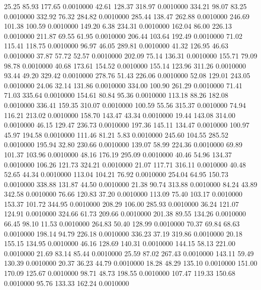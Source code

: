   25.25   85.93  177.65   0.0010000
  42.61  128.37  318.97   0.0010000
 334.21   98.07   83.25   0.0010000
 332.92   76.32  284.82   0.0010000
 285.44  138.47  262.88   0.0010000
 246.69  101.38  100.59   0.0010000
 149.20    6.38  234.31   0.0010000
 162.04   86.00  226.13   0.0010000
 211.87   69.55   61.95   0.0010000
 206.44  103.64  192.49   0.0010000
  71.02  115.41  118.75   0.0010000
  96.97   46.05  289.81   0.0010000
  41.32  126.95   46.63   0.0010000
  37.87   57.72   52.57   0.0010000
 202.09   75.14  136.31   0.0010000
 155.71   79.09   98.78   0.0010000
  40.68  173.61  154.52   0.0010000
 155.14  123.96  311.26   0.0010000
  93.44   49.20  329.42   0.0010000
 278.76   51.43  226.06   0.0010000
  52.08  129.01  243.05   0.0010000
  24.06   32.14  131.86   0.0010000
 334.00  100.90  261.29   0.0010000
  71.41   71.03  335.64   0.0010000
 154.61   80.84   95.36   0.0010000
 113.18   88.26  182.08   0.0010000
 336.41  159.35  310.07   0.0010000
 100.59   55.56  315.37   0.0010000
  74.94  116.21  213.02   0.0010000
 158.70  143.47   43.34   0.0010000
  19.44  143.08  314.00   0.0010000
  46.15  129.47  236.73   0.0010000
 197.36  145.11  134.47   0.0010000
 100.97   45.97  194.58   0.0010000
 111.46   81.21    5.83   0.0010000
 245.60  104.55  285.52   0.0010000
 195.94   32.80  230.66   0.0010000
 139.07   58.99  224.36   0.0010000
  69.89  101.37  103.96   0.0010000
  48.16  176.19  295.09   0.0010000
  40.46   54.96  134.37   0.0010000
 106.26  121.73  324.21   0.0010000
  21.07  117.71  316.11   0.0010000
  40.48   52.65   44.34   0.0010000
 113.04  104.21   76.92   0.0010000
 254.04   64.95  150.73   0.0010000
 338.88  131.87   44.50   0.0010000
  21.38   90.74  313.88   0.0010000
  84.24   43.89  342.58   0.0010000
  76.66  120.83   37.20   0.0010000
 113.09   75.40  103.17   0.0010000
 153.37  101.72  344.95   0.0010000
 208.29  106.00  285.93   0.0010000
  36.24  121.07  124.91   0.0010000
 324.66   61.73  209.66   0.0010000
 201.38   89.55  134.26   0.0010000
  66.45   98.10   11.53   0.0010000
 264.83   50.40  128.99   0.0010000
  70.37   69.84   68.63   0.0010000
 198.14   94.79  226.18   0.0010000
 336.23   37.19  319.86   0.0010000
  20.18  155.15  134.95   0.0010000
  46.16  128.69  140.31   0.0010000
 144.15   58.13  221.00   0.0010000
  21.69   83.14   85.44   0.0010000
  25.59   87.02  267.43   0.0010000
 143.11   59.49  130.39   0.0010000
  20.37   36.23   44.79   0.0010000
  18.28   48.29  135.10   0.0010000
 151.00  170.09  125.67   0.0010000
  98.71   48.73  198.55   0.0010000
 107.47  119.33  150.68   0.0010000
  95.76  133.33  162.24   0.0010000
